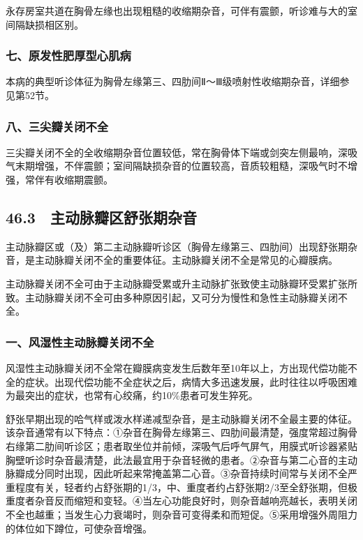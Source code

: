 永存房室共道在胸骨左缘也出现粗糙的收缩期杂音，可伴有震颤，听诊难与大的室间隔缺损相区别。

\subsubsection{七、原发性肥厚型心肌病}

本病的典型听诊体征为胸骨左缘第三、四肋间Ⅱ～Ⅲ级喷射性收缩期杂音，详细参见第52节。

\subsubsection{八、三尖瓣关闭不全}

三尖瓣关闭不全的全收缩期杂音位置较低，常在胸骨体下端或剑突左侧最响，深吸气末期增强，不伴震颤；室间隔缺损杂音的位置较高，音质较粗糙，深吸气时不增强，常伴有收缩期震颤。

\protect\hypertarget{text00128.html}{}{}

\subsection{46.3　主动脉瓣区舒张期杂音}

主动脉瓣区或（及）第二主动脉瓣听诊区（胸骨左缘第三、四肋间）出现舒张期杂音，是主动脉瓣关闭不全的重要体征。主动脉瓣关闭不全是常见的心瓣膜病。

主动脉瓣关闭不全可由于主动脉瓣受累或升主动脉扩张致使主动脉瓣环受累扩张所致。主动脉瓣关闭不全可由多种原因引起，又可分为慢性和急性主动脉瓣关闭不全。

\subsubsection{一、风湿性主动脉瓣关闭不全}

风湿性主动脉瓣关闭不全常在瓣膜病变发生后数年至10年以上，方出现代偿功能不全的症状。出现代偿功能不全症状之后，病情大多迅速发展，此时往往以呼吸困难为最突出的症状，也常有心绞痛，约10\%患者可发生猝死。

舒张早期出现的哈气样或泼水样递减型杂音，是主动脉瓣关闭不全最主要的体征。该杂音通常有以下特点：①杂音在胸骨左缘第三、四肋间最清楚，强度常超过胸骨右缘第二肋间听诊区；患者取坐位并前倾，深吸气后呼气屏气，用膜式听诊器紧贴胸壁听诊时杂音最清楚，此法最宜用于杂音轻微的患者。②杂音与第二心音的主动脉瓣成分同时出现，因此听起来常掩盖第二心音。③杂音持续时间常与关闭不全严重程度有关，轻者约占舒张期的1/3，中、重度者约占舒张期2/3至全舒张期，但极重度者杂音反而缩短和变轻。④当左心功能良好时，则杂音越响亮越长，表明关闭不全也越重；当发生心力衰竭时，则杂音可变得柔和而短促。⑤采用增强外周阻力的体位如下蹲位，可使杂音增强。

